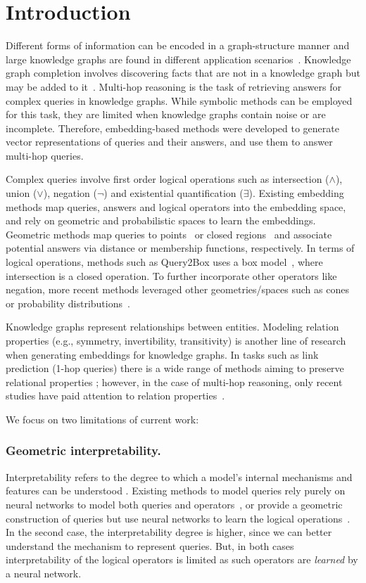 \documentclass[runningheads]{llncs}
\renewcommand{\paragraph}[1]{\subsubsection{#1}}
\begin{document}
\section{Introduction}
Different forms of information can be encoded in a graph-structure
manner and large knowledge graphs are found in different application
scenarios~\cite{Hogan_2021}. Knowledge graph completion involves
discovering facts that are not in a knowledge graph but may be added
to it~\cite{Peng_2023}. Multi-hop reasoning is the task of retrieving
answers for complex queries in knowledge graphs. While symbolic
methods can be employed for this task, they are limited when knowledge
graphs contain noise or are incomplete. Therefore, embedding-based
methods were developed to generate vector representations of queries
and their answers, and use them to answer multi-hop
queries.

Complex queries involve first order logical operations such as
intersection ($\land$), union ($\lor$), negation ($\neg$) and
existential quantification ($\exists$). Existing embedding methods map
queries, answers and logical operators into the embedding space, and
rely on geometric and probabilistic spaces to learn the
embeddings. Geometric methods map queries to points~\cite{gqe} or
closed regions~\cite{query2box,cone,acone} and associate potential
answers via distance or membership functions, respectively. In terms
of logical operations, methods such as Query2Box uses a box
model~\cite{query2box}, where intersection is a closed operation. To
further incorporate other operators like negation, more recent methods
leveraged other geometries/spaces such as cones~\cite{cone,acone} or
probability distributions~\cite{betae}.

Knowledge graphs represent relationships between entities. Modeling
relation properties (e.g., symmetry, invertibility, transitivity) is
another line of research when generating embeddings for knowledge
graphs. In tasks such as link prediction (1-hop queries) there is a
wide range of methods aiming to preserve relational properties
\cite{Jin_2023}; however, in the case of multi-hop reasoning, only
recent studies have paid attention to relation
properties~\cite{acone}.

We focus on two limitations of current work:

\paragraph{Geometric interpretability.} Interpretability refers to the
degree to which a model's internal mechanisms and features can be
understood \cite{Garouani_2024}.
Existing methods to model queries rely purely on neural networks to
model both queries and operators~\cite{long-etal-2022-neural}, or
provide a geometric construction of queries but use neural networks to
learn the logical operations~\cite{query2box,betae,cone}. In the
second case, the interpretability degree is higher, since we can
better understand the mechanism to represent queries. But, in both
cases interpretability of the logical operators is limited as such
operators are \emph{learned} by a neural network.
\end{document}
